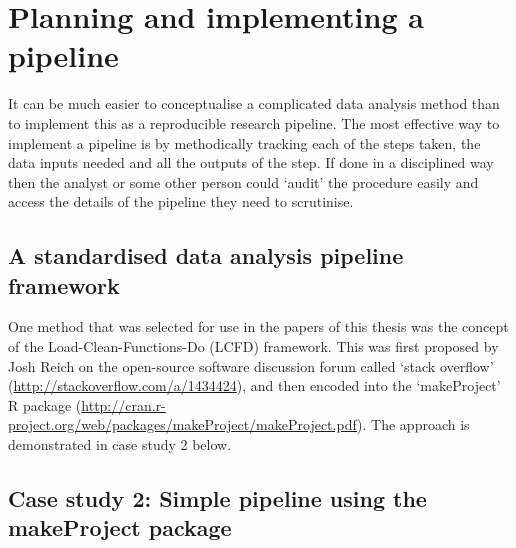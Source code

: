 \documentclass[11pt,a4paper]{article}
\begin{document}
\section{Planning and implementing a
pipeline}\label{planning-and-implementing-a-pipeline}

It can be much easier to conceptualise a complicated data analysis
method than to implement this as a reproducible research pipeline. The
most effective way to implement a pipeline is by methodically tracking
each of the steps taken, the data inputs needed and all the outputs of
the step. If done in a disciplined way then the analyst or some other
person could `audit' the procedure easily and access the details of the
pipeline they need to scrutinise.

\subsection{A standardised data analysis pipeline
framework}\label{a-standardised-data-analysis-pipeline-framework}

One method that was selected for use in the papers of this thesis was
the concept of the Load-Clean-Functions-Do (LCFD) framework. This was
first proposed by Josh Reich on the open-source software discussion
forum called `stack overflow'
(\url{http://stackoverflow.com/a/1434424}), and then encoded into the
`makeProject' R package
(\url{http://cran.r-project.org/web/packages/makeProject/makeProject.pdf}).
The approach is demonstrated in case study 2 below.



\subsection{Case study 2: Simple pipeline using the makeProject
package}\label{case-study-2-simple-pipeline-using-the-makeproject-package}
\end{document}
